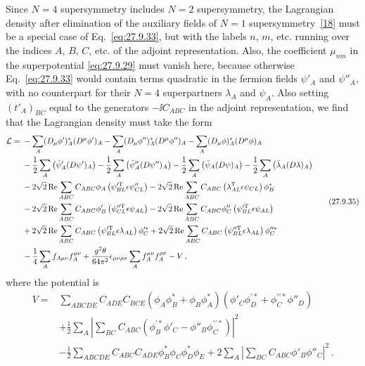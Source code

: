 Since \(N=4\) supersymmetry includes \(N=2\) supersymmetry, the
Lagrangian density after elimination of the auxiliary fields of \(N=1\)
supersymmetry~\hyperref[ch27-ref-18]{[18]} must be a special case of
Eq.~\eqref{eq:27.9.33}, but with the labels \(n\), \(m\), etc. running over
the indices \(A\), \(B\), \(C\), etc. of the adjoint representation. Also,
the coefficient \(\mu_{nm}\) in the superpotential \eqref{eq:27.9.29} must
vanish here, because otherwise Eq.~\eqref{eq:27.9.33} would contain terms
quadratic in the fermion fields \(\psi'_A\) and \(\psi''_A\), with no
counterpart for their \(N=4\) superpartners \(\lambda_A\) and \(\psi_A\).
Also setting \((t'_A)_{BC}\) equal to the generators \(-\ii C_{ABC}\) in the
adjoint representation, we find that the Lagrangian density must take the
form
\begin{equation}
  \begin{aligned}
  \mathcal{L}={}&
  -\sum_A(D_\mu\phi')_A^*(D^\mu\phi')_A
  -\sum_A(D_\mu\phi'')_A^*(D^\mu\phi'')_A
  -\sum_A(D_\mu\phi)_A^*(D^\mu\phi)_A
  \\
  &-\frac12\sum_A\left(\bar\psi'_A(\sl{D}\psi')_A\right)
  -\frac12\sum_A\left(\bar\psi''_A(\sl{D}\psi'')_A\right)
  -\frac12\sum_A\left(\bar\psi_A(\sl{D}\psi)_A\right)
  -\frac12\sum_A\left(\bar\lambda_A(\sl{D}\lambda)_A\right)
  \\
  &-2\sqrt{2}\operatorname{Re}\sum_{ABC}C_{ABC}\phi_A
    \left(\psi_{BL}^{\prime\mathrm T}\epsilon\psi''_{CL}\right)
  -2\sqrt{2}\operatorname{Re}\sum_{ABC}C_{ABC}
    \left(\lambda_{AL}^{\mathsf T}\epsilon\psi_{CL}\right)\phi_B^*
  \\
  &-2\sqrt{2}\operatorname{Re}\sum_{ABC}C_{ABC}\phi'_B
    \left(\psi_{CL}^{\prime\prime\mathrm T}\epsilon\psi_{AL}\right)
  -2\sqrt{2}\operatorname{Re}\sum_{ABC}C_{ABC}\phi''_C
    \left(\psi_{BL}^{\prime\mathrm T}\epsilon\psi_{AL}\right)
  \\
  &+2\sqrt{2}\operatorname{Re}\sum_{ABC}C_{ABC}
    \left(\psi_{BL}^{\prime\mathrm T}\epsilon\lambda_{AL}\right)\phi_C^{\prime *}
  +2\sqrt{2}\operatorname{Re}\sum_{ABC}C_{ABC}
    \left(\psi_{BL}^{\prime\prime\mathrm T}\epsilon\lambda_{AL}\right)
    \phi_C^{\prime\prime *}
  \\
  &-\frac14\sum_Af_{A\mu\nu}f_A^{\mu\nu}
  +\frac{g^2\theta}{64\pi^2}\epsilon_{\mu\nu\rho\sigma}
    \sum_Af_A^{\mu\nu}f_A^{\rho\sigma}-V\,,
  \end{aligned}
  \tag{27.9.35}\label{eq:27.9.35}
\end{equation}
where the potential is
\begin{equation}
  \begin{aligned}
  V={}&
  \sum_{ABCDE}C_{ADE}C_{BCE}
    \left(\phi_A\phi_B^*+\phi_B\phi_A^*\right)
    \left(\phi'_C\phi_D^{\prime *}+\phi_C^{\prime\prime *}\phi''_D\right)
  \\
  &+\frac12\sum_A\left|
    \sum_{BC}C_{ABC}
    \left(\phi_B^{\prime *}\phi'_C-\phi''_B\phi_C^{\prime\prime *}\right)
  \right|^2
  \\
  &-\frac12\sum_{ABCDE}C_{ABC}C_{ADE}
    \phi_B^*\phi_C\phi_D^*\phi_E
  +2\sum_A\left|\sum_{BC}C_{ABC}\phi'_B\phi''_C\right|^2\,.
  \end{aligned}
  \tag{27.9.36}\label{eq:27.9.36}
\end{equation}
